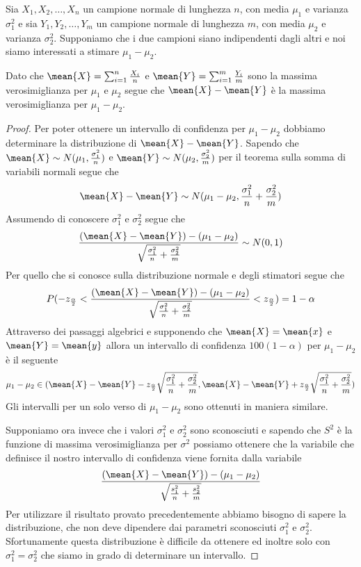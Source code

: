 \documentclass[a4paper,12pt, oneside]{book}
\begin{document}
\begin{teo}
Sia $X_1, X_2, \dots, X_n$ un campione normale di lunghezza $n$, con media $\mu_1$ e varianza $\sigma_1^2$ e sia 
$Y_1, Y_2, \dots, Y_m$ un campione normale di lunghezza $m$, con media $\mu_2$ e varianza $\sigma_2^2$.\newline
Supponiamo che i due campioni siano indipendenti dagli altri e noi siamo interessati a stimare $\mu_1 - \mu_2$.

Dato che $\mean{X} = \sum _{i = 1}^n \frac{X_i}{n}$ e $\mean{Y} = \sum _{i = 1}^m \frac{Y_i}{m}$ sono la massima
verosimiglianza per $\mu_1$ e $\mu_2$ segue che $\mean{X} - \mean{Y}$ è la massima verosimiglianza per $\mu_1 - \mu_2$.
\end{teo}
\begin{proof}
    Per poter ottenere un intervallo di confidenza per $\mu_1 - \mu_2$ dobbiamo determinare 
    la distribuzione di $\mean{X} - \mean{Y}$.\newline
    Sapendo che $\mean{X} \sim N(\mu_1, \frac{\sigma_1^2}{n})$ e $\mean{Y} \sim N(\mu_2, \frac{\sigma_2^2}{m})$ 
    per il teorema sulla somma di variabili normali segue che 
    \[ \mean{X} - \mean{Y} \sim N(\mu_1 - \mu_2, \frac{\sigma_1^2}{n} + \frac{\sigma_2^2}{m})\]
    Assumendo di conoscere $\sigma_1^2$ e $\sigma_2^2$ segue che 
    \[ \frac{(\mean{X} - \mean{Y}) - (\mu_1 - \mu_2)}{\sqrt{\frac{\sigma_1^2}{n} + \frac{\sigma_2^2}{m}}} \sim N(0, 1)\]
    Per quello che si conosce sulla distribuzione normale e degli stimatori segue che
    \[ P(-z_{\frac{\alpha}{2}} < \frac{(\mean{X} - \mean{Y}) - (\mu_1 - \mu_2)}{\sqrt{\frac{\sigma_1^2}{n} + \frac{\sigma_2^2}{m}}}
                               < z_{\frac{\alpha}{2}}) = 1 - \alpha \]
    Attraverso dei passaggi algebrici e supponendo che $\mean{X} = \mean{x}$ e $\mean{Y} = \mean{y}$ allora un
    intervallo di confidenza $100(1 - \alpha)$ per $\mu_1 - \mu_2$ è il seguente
    \[ \mu_1 - \mu_2 \in (\mean{X} - \mean{Y} - z_{\frac{\alpha}{2}} \sqrt{\frac{\sigma_1^2}{n} + \frac{\sigma_2^2}{m}},
                          \mean{X} - \mean{Y} + z_{\frac{\alpha}{2}} \sqrt{\frac{\sigma_1^2}{n} + \frac{\sigma_2^2}{m}}) \]
    Gli intervalli per un solo verso di $\mu_1 - \mu_2$ sono ottenuti in maniera similare.

    Supponiamo ora invece che i valori $\sigma_1^2$ e $\sigma_2^2$ sono sconosciuti e sapendo che $S^2$ è la funzione di
    massima verosimiglianza per $\sigma^2$ possiamo ottenere che la variabile che definisce il nostro intervallo di
    confidenza viene fornita dalla variabile
    \[ \frac{(\mean{X} - \mean{Y}) - (\mu_1 - \mu_2)}{\sqrt{\frac{s_1^2}{n} + \frac{s_2^2}{m}}} \]
    Per utilizzare il risultato provato precedentemente abbiamo bisogno di sapere la distribuzione, che non deve
    dipendere dai parametri sconosciuti $\sigma_1^2$ e $\sigma_2^2$.\newline
    Sfortunamente questa distribuzione è difficile da ottenere ed inoltre solo con $\sigma_1^2 = \sigma_2^2$ che siamo
    in grado di determinare un intervallo.


\end{proof}
\end{document}
